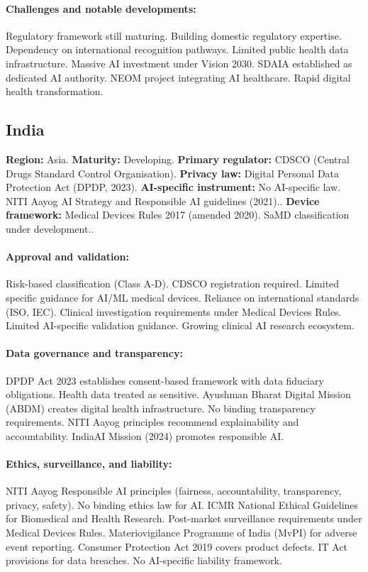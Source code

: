 {\paragraph{Challenges and notable developments:}
Regulatory framework still maturing. Building domestic regulatory expertise. Dependency on international recognition pathways. Limited public health data infrastructure.
Massive AI investment under Vision 2030. SDAIA established as dedicated AI authority. NEOM project integrating AI healthcare. Rapid digital health transformation.


\subsection{India}
\textbf{Region:} Asia.
\textbf{Maturity:} Developing.
\textbf{Primary regulator:} CDSCO (Central Drugs Standard Control Organisation).
\textbf{Privacy law:} Digital Personal Data Protection Act (DPDP, 2023).
\textbf{AI-specific instrument:} No AI-specific law. NITI Aayog AI Strategy and Responsible AI guidelines (2021)..
\textbf{Device framework:} Medical Devices Rules 2017 (amended 2020). SaMD classification under development..

\paragraph{Approval and validation:}
Risk-based classification (Class A-D). CDSCO registration required. Limited specific guidance for AI/ML medical devices. Reliance on international standards (ISO, IEC).
Clinical investigation requirements under Medical Devices Rules. Limited AI-specific validation guidance. Growing clinical AI research ecosystem.

\paragraph{Data governance and transparency:}
DPDP Act 2023 establishes consent-based framework with data fiduciary obligations. Health data treated as sensitive. Ayushman Bharat Digital Mission (ABDM) creates digital health infrastructure.
No binding transparency requirements. NITI Aayog principles recommend explainability and accountability. IndiaAI Mission (2024) promotes responsible AI.

\paragraph{Ethics, surveillance, and liability:}
NITI Aayog Responsible AI principles (fairness, accountability, transparency, privacy, safety). No binding ethics law for AI. ICMR National Ethical Guidelines for Biomedical and Health Research.
Post-market surveillance requirements under Medical Devices Rules. Materiovigilance Programme of India (MvPI) for adverse event reporting.
Consumer Protection Act 2019 covers product defects. IT Act provisions for data breaches. No AI-specific liability framework.

}
